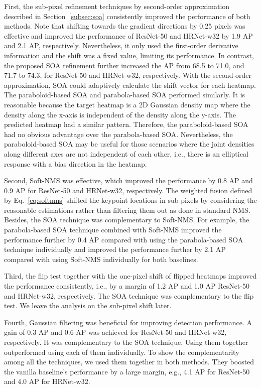 \documentclass[twocolumn]{svjour3}          \smartqed  \usepackage{natbib}
\begin{document}
First, the sub-pixel refinement techniques by second-order approximation described in Section~\ref{subsec:soa} consistently improved the performance of both methods. Note that shifting towards the gradient directions by 0.25 pixels was effective and improved the performance of ResNet-50 and HRNet-w32 by 1.9 AP and 2.1 AP, respectively. Nevertheless, it only used the first-order derivative information and the shift was a fixed value, limiting its performance. In contrast, the proposed SOA refinement further increased the AP from 68.5 to 71.0, and 71.7 to 74.3, for ResNet-50 and HRNet-w32, respectively. With the second-order approximation, SOA could adaptively calculate the shift vector for each heatmap. The paraboloid-based SOA and parabola-based SOA performed similarly. It is reasonable because the target heatmap is a 2D Gaussian density map where the density along the x-axis is independent of the density along the y-axis. The predicted heatmap had a similar pattern. Therefore, the paraboloid-based SOA had no obvious advantage over the parabola-based SOA. Nevertheless, the paraboloid-based SOA may be useful for those scenarios where the joint densities along different axes are not independent of each other, i.e., there is an elliptical response with a bias direction in the heatmap.

Second, Soft-NMS was effective, which improved the performance by 0.8 AP and 0.9 AP for ResNet-50 and HRNet-w32, respectively. The weighted fusion defined by Eq.~\eqref{eq:softnms} shifted the keypoint locations in sub-pixels by considering the reasonable estimations rather than filtering them out as done in standard NMS. Besides, the SOA technique was complementary to Soft-NMS. For example, the parabola-based SOA technique combined with Soft-NMS improved the performance further by 0.4 AP compared with using the parabola-based SOA technique individually and improved the performance further by 2.1 AP compared with using Soft-NMS individually for both baselines. 

Third, the flip test together with the one-pixel shift of flipped heatmaps improved the performance consistently, i.e., by a margin of 1.2 AP and 1.0 AP ResNet-50 and HRNet-w32, respectively. The SOA technique was complementary to the flip test. We leave the analysis on the sub-pixel shift later.

Fourth, Gaussian filtering was beneficial for improving detection performance. A gain of 0.3 AP and 0.6 AP was achieved for ResNet-50 and HRNet-w32, respectively. It was complementary to the SOA technique. Using them together outperformed using each of them individually. To show the complementarity among all the techniques, we used them together in both methods. They boosted the vanilla baseline's performance by a large margin, e.g., 4.1 AP for ResNet-50 and 4.0 AP for HRNet-w32.
\end{document}
